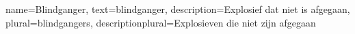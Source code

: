 
{
    name={Blindganger},
    text={blindganger},
    description={Explosief dat niet is afgegaan},
    plural={blindgangers},
    descriptionplural={Explosieven die niet zijn afgegaan}
}

